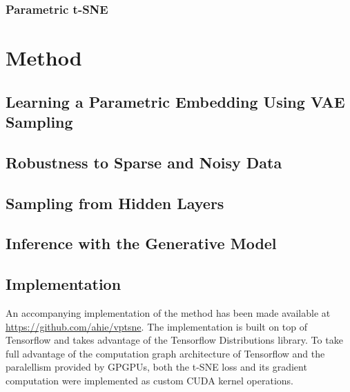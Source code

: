 \newpage \phantom{x}
\newpage \phantom{x}
\newpage

\subsection{Parametric t-SNE}
\label{subsection:parametric_tsne}
\newpage

\chapter{Method}
\label{ch:method}

\section{Learning a Parametric Embedding Using VAE Sampling}
\newpage \phantom{x}
\newpage \phantom{x}
\newpage

\section{Robustness to Sparse and Noisy Data}
\label{section:robustness_to_sparse_and_noisy_data}
\newpage

\section{Sampling from Hidden Layers}
\label{section:sampling_from_hidden_layers}
\newpage

\section{Inference with the Generative Model}
\newpage

\section{Implementation}
\label{section:implementation}

An accompanying implementation of the method has been made available at \url{https://github.com/ahie/vptsne}. The implementation is built on top of Tensorflow \citep{tensorflow} and takes advantage of the Tensorflow Distributions \citep{tensorflow_distributions} library. To take full advantage of the computation graph architecture of Tensorflow and the paralellism provided by GPGPUs, both the t-SNE loss and its gradient computation were implemented as custom CUDA \citep{cuda} kernel operations.


